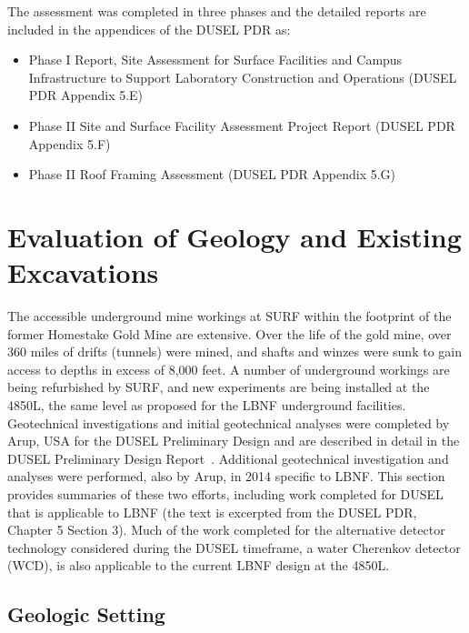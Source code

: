 The assessment %
was completed in three phases and the detailed reports are included in the appendices of the DUSEL PDR as:

\begin{itemize}
 \item Phase I Report, Site Assessment for Surface Facilities and Campus Infrastructure to Support Laboratory Construction and Operations (DUSEL PDR Appendix 5.E)
 \item Phase II Site and Surface Facility Assessment Project Report (DUSEL PDR Appendix 5.F)
 \item Phase II Roof Framing Assessment (DUSEL PDR Appendix 5.G)
     \end{itemize}


\section{Evaluation of Geology and Existing Excavations}
\label{sec:fscf-site-cond-geo}

The accessible underground mine workings at SURF within the footprint of the former Homestake Gold Mine are extensive.  %
Over the life of the gold mine, over 360 miles of drifts (tunnels) were mined, and shafts and winzes were sunk to gain access to depths in excess of 8,000 feet. A number of underground workings are being refurbished by SURF, and new experiments are being installed %
at the 4850L, the same level as proposed for the LBNF underground facilities. Geotechnical investigations and initial geotechnical analyses were completed by Arup, USA for the DUSEL Preliminary Design and are described in detail in the DUSEL Preliminary Design Report~\cite{lachel-geotech, dusel-pdr}. Additional geotechnical investigation and analyses were performed, also by Arup, in 2014 specific to LBNF.  This section provides summaries of these two efforts, including work completed for DUSEL that is applicable to LBNF (the text is excerpted from the DUSEL PDR, Chapter 5 Section 3). Much of the work completed for the alternative detector technology considered during the DUSEL timeframe, a water Cherenkov detector (WCD), is also applicable to the current LBNF design at the 4850L.  


\subsection{Geologic Setting}
\label{sec:fscf-site-cond-geo-set}

